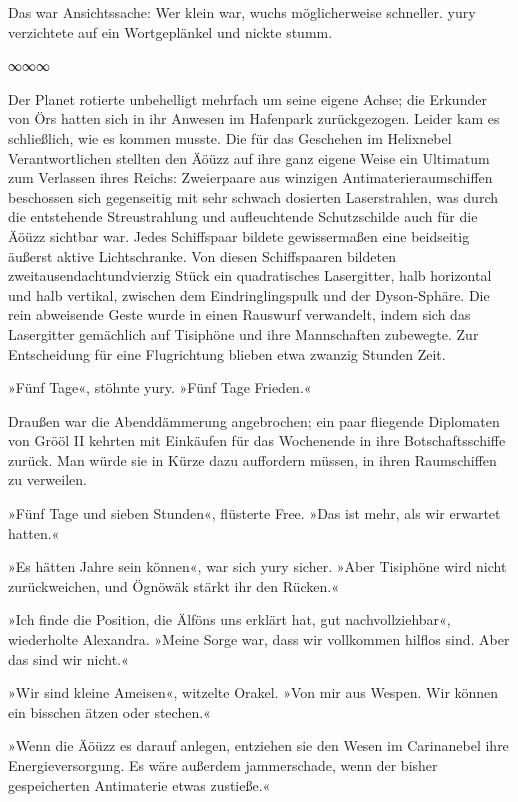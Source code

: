 Das war Ansichtssache: Wer klein war, wuchs möglicherweise schneller. yury verzichtete auf ein Wortgeplänkel und nickte stumm.

\begin{center}
∞∞∞
\end{center}

Der Planet rotierte unbehelligt mehrfach um seine eigene Achse; die Erkunder von Örs hatten sich in ihr Anwesen im Hafenpark zurückgezogen. Leider kam es schließlich, wie es kommen musste. Die für das Geschehen im Helixnebel Verantwortlichen stellten den Äöüzz auf ihre ganz eigene Weise ein Ultimatum zum Verlassen ihres Reichs: Zweierpaare aus winzigen Antimaterieraumschiffen beschossen sich gegenseitig mit sehr schwach dosierten Laserstrahlen, was durch die entstehende Streustrahlung und aufleuchtende Schutzschilde auch für die Äöüzz sichtbar war. Jedes Schiffspaar bildete gewissermaßen eine beidseitig äußerst aktive Lichtschranke. Von diesen Schiffspaaren bildeten zweitausendachtundvierzig Stück ein quadratisches Lasergitter, halb horizontal und halb vertikal, zwischen dem Eindringlingspulk und der Dyson-Sphäre. Die rein abweisende Geste wurde in einen Rauswurf verwandelt, indem sich das Lasergitter gemächlich auf Tisiphöne und ihre Mannschaften zubewegte. Zur Entscheidung für eine Flugrichtung blieben etwa zwanzig Stunden Zeit.

»Fünf Tage«, stöhnte yury. »Fünf Tage Frieden.«

Draußen war die Abenddämmerung angebrochen; ein paar fliegende Diplomaten von Grööl II kehrten mit Einkäufen für das Wochenende in ihre Botschaftsschiffe zurück. Man würde sie in Kürze dazu auffordern müssen, in ihren Raumschiffen zu verweilen.

»Fünf Tage und sieben Stunden«, flüsterte Free. »Das ist mehr, als wir erwartet hatten.«

»Es hätten Jahre sein können«, war sich yury sicher. »Aber Tisiphöne wird nicht zurückweichen, und Ögnöwäk stärkt ihr den Rücken.«

»Ich finde die Position, die Älföns uns erklärt hat, gut nachvollziehbar«, wiederholte Alexandra. »Meine Sorge war, dass wir vollkommen hilflos sind. Aber das sind wir nicht.«

»Wir sind kleine Ameisen«, witzelte Orakel. »Von mir aus Wespen. Wir können ein bisschen ätzen oder stechen.«

»Wenn die Äöüzz es darauf anlegen, entziehen sie den Wesen im Carinanebel ihre Energieversorgung. Es wäre außerdem jammerschade, wenn der bisher gespeicherten Antimaterie etwas zustieße.«

